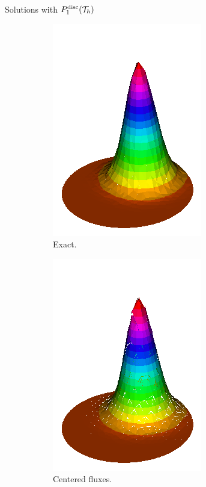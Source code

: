 \begin{frame}{Solutions with $\relax{P}^{\text{disc}}_1(\mathcal{T}_h)$}
\begin{figure}[h!]
\begin{subfigure}[b]{0.27\textwidth}
				\includegraphics[scale=0.18]{img/Conveccion_Reaccion/Recortes/steady_convect_react_exact_n_64.png}
				\caption{Exact.}
			\end{subfigure}
			\begin{subfigure}[b]{0.27\textwidth}
				\centering
				\includegraphics[scale=0.18]{img/Conveccion_Reaccion/Recortes/steady_convect_react_approx_CF_n_64.png}
				\caption{Centered fluxes.}
			\end{subfigure}
			\begin{subfigure}[b]{0.27\textwidth}
				\centering

\end{subfigure}
\end{figure}
\end{frame}
